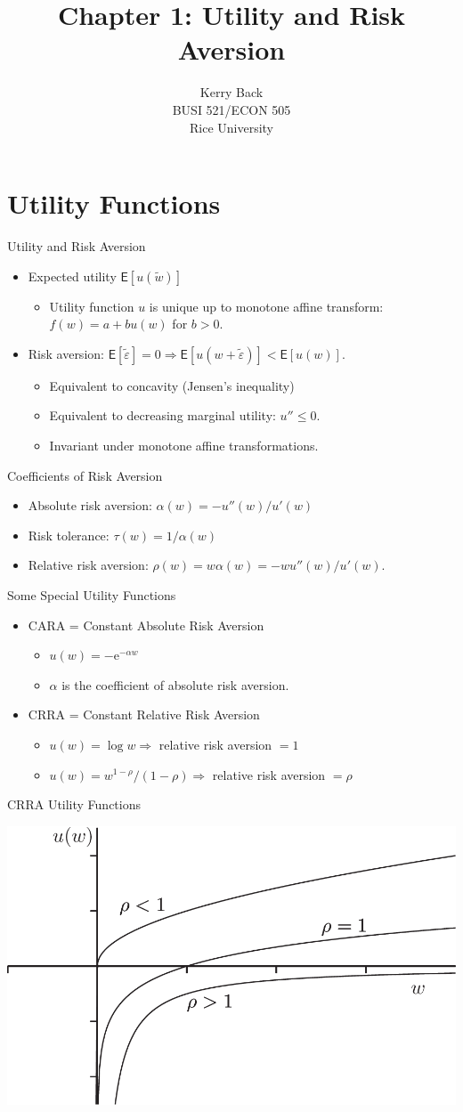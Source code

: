 \documentclass[10pt]{beamer}
\title{Chapter 1: Utility and Risk Aversion}
\date{}
\author{Kerry Back\\ 
BUSI 521/ECON 505\\
Rice University}
\newcommand{\bi}{\begin{itemize}}
\newcommand{\ei}{\end{itemize}}
\newcommand{\im}{\item}
\newcommand{\E}{\mathrm{e}}
\newcommand{\mye}{\ensuremath{\mathsf{E}}}
\begin{document}
\maketitle

\section{Utility Functions}

\begin{frame}{Utility and Risk Aversion}
\bi

\im Expected utility $\mye[u(\tilde{w})]$
\bi
\im Utility function $u$ is unique up to monotone affine transform: $f(w) = a+b u(w)$ for $b>0$.
\ei

\im Risk aversion: $\mye[\tilde{\varepsilon}]=0 \Rightarrow \mye[u(w+\tilde{\varepsilon})] < \mye[u(w)]$.
\bi
\im Equivalent to concavity (Jensen's inequality)
\im Equivalent to decreasing marginal utility: $u'' \leq 0$.
\im Invariant under monotone affine transformations.
\ei

\ei
\end{frame}




\begin{frame}{Coefficients of Risk Aversion}
\bi    
\im Absolute risk aversion: $\alpha(w) = -u''(w)/u'(w)$
\im Risk tolerance: $\tau(w) =  1/\alpha(w)$
\im Relative risk aversion: $\rho(w) = w\alpha(w) = - wu''(w)/u'(w)$.
\ei
\end{frame}


\begin{frame}{Some Special Utility Functions}
\bi
    
\im CARA = Constant Absolute Risk Aversion
\bi 
\im $u(w) = - \E^{-\alpha w}$
\im $\alpha$ is the coefficient of absolute risk aversion.
\ei 

\im CRRA = Constant Relative Risk Aversion 
\bi
\im 
$u(w) = \log w \Rightarrow$ relative risk aversion $ = 1$
\im $u(w) = w^{1-\rho}/ (1-\rho) \Rightarrow$ relative risk aversion $=\rho$
\ei

\ei
\end{frame}

\begin{frame}{CRRA Utility Functions}
  \begin{center}
  \includegraphics{images/fig1_4.png}
  \end{center}
  \end{frame}
\end{document}

